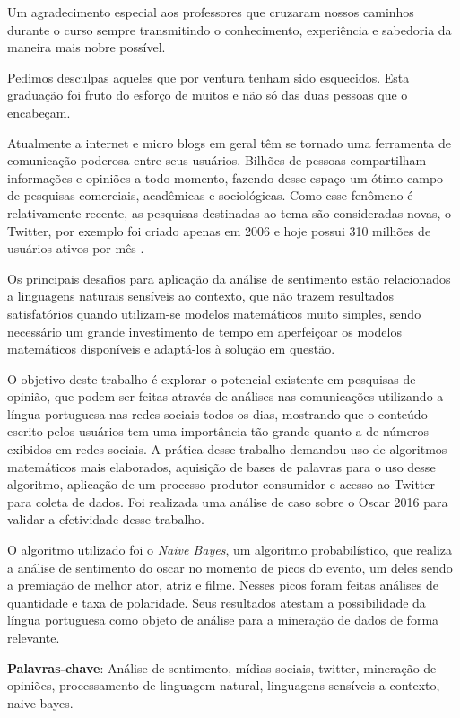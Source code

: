 Um agradecimento especial aos professores que cruzaram nossos caminhos durante o curso sempre transmitindo o conhecimento, experiência e sabedoria da maneira mais nobre possível.

Pedimos desculpas aqueles que por ventura tenham sido esquecidos. Esta graduação foi fruto do esforço de muitos e não só das duas pessoas que o encabeçam.
\begin{resumo}

Atualmente a internet e micro blogs em geral têm se tornado uma ferramenta de comunicação poderosa entre seus usuários. Bilhões de pessoas compartilham informações e opiniões a todo momento, fazendo desse espaço um ótimo campo de pesquisas comerciais, acadêmicas e sociológicas.  Como esse fenômeno é relativamente recente, as pesquisas destinadas ao tema são consideradas novas, o Twitter, por exemplo foi criado apenas em 2006 e hoje possui 310 milhões de usuários ativos por mês .


Os principais desafios para aplicação da análise de sentimento estão relacionados a linguagens naturais sensíveis ao contexto, que não trazem resultados satisfatórios quando utilizam-se modelos matemáticos muito simples, sendo necessário um grande investimento de tempo em aperfeiçoar os modelos matemáticos disponíveis e adaptá-los à solução em questão.


O objetivo deste trabalho é explorar o potencial existente em pesquisas de opinião,  que podem ser feitas através de análises nas comunicações utilizando a  língua portuguesa nas redes sociais todos os dias, mostrando que o conteúdo escrito pelos usuários tem uma importância tão grande quanto a de números exibidos em redes sociais. A prática desse trabalho demandou uso de algoritmos matemáticos mais elaborados, aquisição de bases de palavras para o uso desse algoritmo, aplicação de um processo produtor-consumidor e acesso ao Twitter para coleta de dados. Foi realizada uma análise de caso sobre o Oscar 2016 para validar a efetividade desse trabalho. 


O algoritmo utilizado foi o \textit{Naive Bayes}, um algoritmo probabilístico, que realiza a análise de sentimento do oscar no momento de picos do evento, um deles sendo a premiação de melhor ator, atriz e filme. Nesses picos foram feitas análises de quantidade  e  taxa de polaridade. Seus resultados atestam a possibilidade da língua portuguesa como objeto de análise para a mineração de dados de forma relevante.


{\hspace{-8mm} \bf{Palavras-chave}}: Análise de sentimento, mídias sociais, twitter, mineração de opiniões, processamento de linguagem natural, linguagens sensíveis a contexto, naive bayes.

\acresetall

\end{resumo}

